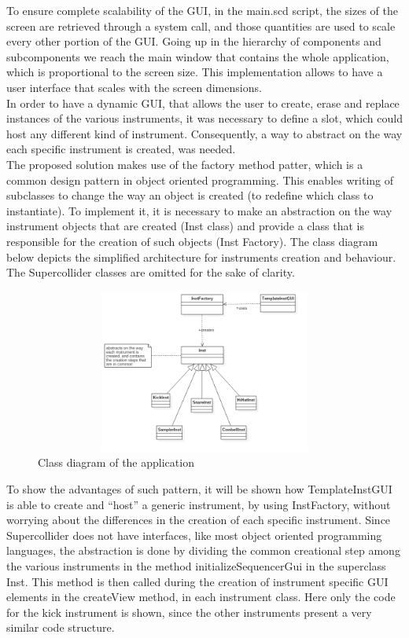 \documentclass[main.tex]{subfiles}
\begin{document}
To ensure complete scalability of the GUI, in the main.scd script, the sizes of the screen are retrieved through a system call, and those quantities are used to scale every other portion of the GUI. Going up in the hierarchy of components and subcomponents we reach the main window that contains the whole application, which is proportional to the screen size. This implementation allows to have a user interface that scales with the screen dimensions.\\
[2mm]
In order to have a dynamic GUI, that allows the user to create, erase and replace instances of the various instruments, it was necessary to define a slot, which could host any different kind of instrument. Consequently, a way to abstract on the way each specific instrument is created, was needed.\\ 
The proposed solution makes use of the factory method patter, which is a common design pattern in object oriented programming. This enables writing of subclasses to change the way an object is created (to redefine which class to instantiate)\cite{DesignPattern:Gamma}. 
To implement it, it is necessary to make an abstraction on the way instrument objects that are created (Inst class) and provide a class that is responsible for the creation of such objects (Inst Factory).
The class diagram below depicts the simplified architecture for instruments creation and behaviour. The Supercollider classes are omitted for the sake of clarity.
\begin{figure}[htbp]
\centering
\includegraphics[height=5.4cm, width=12cm, keepaspectratio]{images/factory_pattern_uml.png}
\caption{Class diagram of the application}
\label{fig:uml}
\end{figure}

To show the advantages of such pattern, it will be shown how TemplateInstGUI is able to create and “host” a generic instrument, by using InstFactory, without worrying about the differences in the creation of each specific instrument. Since Supercollider does not have interfaces, like most object oriented programming languages, the abstraction is done by dividing the common creational step among the various instruments in the method  initializeSequencerGui  in the superclass Inst. This method is then called during the creation of instrument specific GUI elements in the createView method, in each instrument class. Here only the code for the kick instrument is shown, since the other instruments present a very similar code structure.
\end{document}
